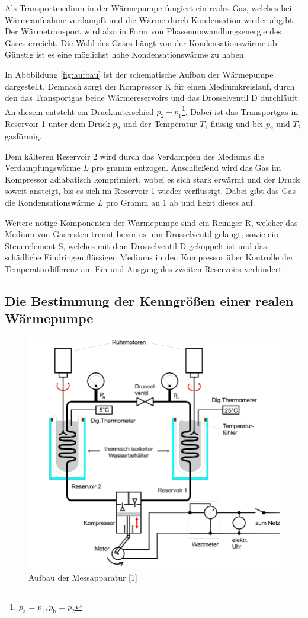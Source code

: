 Als Transportmedium in der Wärmepumpe fungiert ein reales Gas,
welches bei Wärmeaufnahme verdampft und die Wärme durch Kondensation wieder abgibt. Der Wärmetransport wird also in Form 
von Phasenumwandlungsenergie des Gases erreicht.
Die Wahl des Gases hängt von der Kondensationswärme ab. Günstig ist es eine möglichst hohe Kondensationswärme zu haben. 

In Abbbildung \ref{fig:aufbau} ist der schematische Aufbau der Wärmepumpe dargestellt.
Demnach sorgt der Kompressor K für einen Mediumkreislauf, durch den das Transportgas beide Wärmereservoirs und das Drosselventil D durchläuft.
An diesem entsteht ein Druckunterschied $p_2-p_1$\footnote{$p_\text{a}=p_1, p_\text{b}=p_2$}. Dabei ist das Transportgas in Reservoir 1 unter dem Druck $p_2$
und der Temperatur $T_1$ flüssig und bei $p_2$ und $T_2$ gasförmig.

Dem kälteren Reservoir 2 wird durch das Verdampfen des Mediums die Verdampfungswärme $L$ pro gramm entzogen. 
Anschließend wird das Gas im Kompressor adiabatisch komprimiert, wobei es sich stark erwärmt und der Druck soweit ansteigt, bis es sich im Reservoir 1
wieder verflüssigt. Dabei gibt das Gas die Kondensationswärme $L$ pro Gramm an 1 ab und heizt dieses auf.

Weitere nötige Komponenten der Wärmepumpe sind ein Reiniger R, welcher das Medium von Gasresten trennt bevor es uim Drosselventil gelangt, sowie ein Steuerelement S,
welches mit dem Drosselventil D gekoppelt ist und das schädliche Eindringen flüssigen Mediums in den Kompressor über Kontrolle der Temperaturdifferenz
am Ein-und Ausgang des zweiten Reservoirs verhindert. 

\subsection{Die Bestimmung der Kenngrößen einer realen Wärmepumpe}

\begin{figure}
    \centering
    \includegraphics[scale=0.5]{aufbau2.pdf}
    \caption{Aufbau der Messapparatur [1]}
    \label{fig:aufbau2}
\end{figure}

